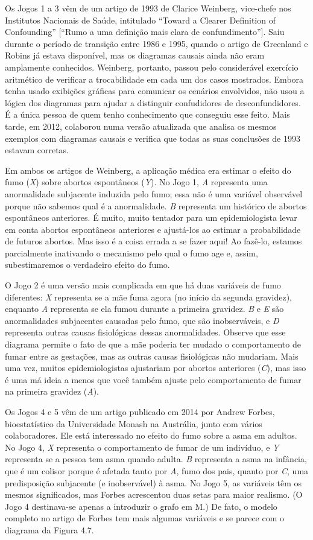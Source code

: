 \documentclass[11pt,a5paper,twoside]{book}
\begin{document}
Os Jogos 1 a 3 vêm de um artigo de 1993 de Clarice Weinberg, vice-chefe nos Institutos Nacionais de Saúde, intitulado “Toward a Clearer Definition of Confounding” [“Rumo a uma definição mais clara de confundimento”]. Saiu durante o período de transição entre 1986 e 1995, quando o artigo de Greenland e Robins já estava disponível, mas os diagramas causais ainda não eram amplamente conhecidos. Weinberg, portanto, passou pelo considerável exercício aritmético de verificar a trocabilidade em cada um dos casos mostrados. Embora tenha usado exibições gráficas para comunicar os cenários envolvidos, não usou a lógica dos diagramas para ajudar a distinguir confudidores de desconfundidores. É a única pessoa de quem tenho conhecimento que conseguiu esse feito. Mais tarde, em 2012, colaborou numa versão atualizada que analisa os mesmos exemplos com diagramas causais e verifica que todas as suas conclusões de 1993 estavam corretas.

Em ambos os artigos de Weinberg, a aplicação médica era estimar o efeito do fumo (\textit{X}) sobre abortos espontâneos (\textit{Y}). No Jogo 1, \textit{A} representa uma anormalidade subjacente induzida pelo fumo; essa não é uma variável observável porque não sabemos qual é a anormalidade. \textit{B} representa um histórico de abortos espontâneos anteriores. É muito, muito tentador para um epidemiologista levar em conta abortos espontâneos anteriores e ajustá-los ao estimar a probabilidade de futuros abortos. Mas isso é a coisa errada a se fazer aqui! Ao fazê-lo, estamos parcialmente inativando o mecanismo pelo qual o fumo age e, assim, subestimaremos o verdadeiro efeito do fumo.

O Jogo 2 é uma versão mais complicada em que há duas variáveis de fumo diferentes: \textit{X} representa se a mãe fuma agora (no início da segunda gravidez), enquanto \textit{A} representa se ela fumou durante a primeira gravidez. \textit{B} e \textit{E} são anormalidades subjacentes causadas pelo fumo, que são inobserváveis, e \textit{D} representa outras causas fisiológicas dessas anormalidades. Observe que esse diagrama permite o fato de que a mãe poderia ter mudado o comportamento de fumar entre as gestações, mas as outras causas fisiológicas não mudariam. Mais uma vez, muitos epidemiologistas ajustariam por abortos anteriores (\textit{C}), mas isso é uma má ideia a menos que você também ajuste pelo comportamento de fumar na primeira gravidez (\textit{A}).

Os Jogos 4 e 5 vêm de um artigo publicado em 2014 por Andrew Forbes, bioestatístico da Universidade Monash na Austrália, junto com vários colaboradores. Ele está interessado no efeito do fumo sobre a asma em adultos. No Jogo 4, \textit{X} representa o comportamento de fumar de um indivíduo, e \textit{Y} representa se a pessoa tem asma quando adulta. \textit{B} representa a asma na infância, que é um colisor porque é afetada tanto por \textit{A}, fumo dos pais, quanto por \textit{C}, uma predisposição subjacente (e inobservável) à asma. No Jogo 5, as variáveis têm os mesmos significados, mas Forbes acrescentou duas setas para maior realismo. (O Jogo 4 destinava-se apenas a introduzir o grafo em M.) De fato, o modelo completo no artigo de Forbes tem mais algumas variáveis e se parece com o diagrama da Figura 4.7.
\end{document}
